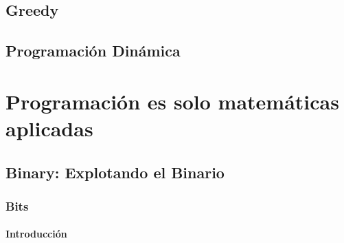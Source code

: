 \documentclass[12pt, fleqn]{report}                             %
\theoremstyle{break}                                            %
\begin{document}
\chapter{Greedy}

\clearpage
\chapter{Programación Dinámica}



\part{Programación es solo matemáticas aplicadas}

    \clearpage
    \chapter{Binary: Explotando el Binario}

        \clearpage
        \section{Bits}

            \subsection{Introducción}
\end{document}
